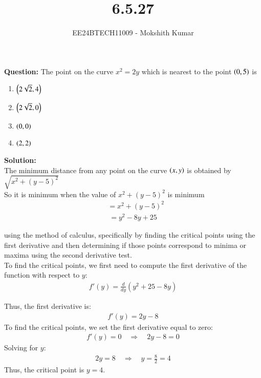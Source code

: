 \documentclass[journal]{IEEEtran}
\begin{document}

\vspace{3cm}

\title{6.5.27}
\author{EE24BTECH11009 - Mokshith Kumar}
\maketitle
\textbf{Question:}
The point on the curve $x^2=2y$ which is nearest to the point $\left(0,5\right)$ is\\
\begin{enumerate}
    \item $\left(2\sqrt{2},4\right)$
    \item $\left(2\sqrt{2},0\right)$
    \item $\left(0,0\right)$
    \item $\left(2,2\right)$
\end{enumerate}
\textbf{Solution:}\\
The minimum distance from any point on the curve $\left(x,y\right)$
is obtained by $\sqrt{x^2+(y-5)^2}$\\
So it is minimum when the value of $x^2+(y-5)^2$ is minimum\\
\begin{align}
    &= x^2+(y-5)^2 
\end{align}
\begin{align}
    = y^2-8y+25
\end{align}

using the method of calculus, specifically by finding the critical points using the first derivative and then determining if those points correspond to minima or maxima using the second derivative test.\\

To find the critical points, we first need to compute the first derivative of the function with respect to $ y $:\\
\begin{align}
  f'(y) = \frac{d}{dy}(y^2 + 25 - 8y)  
\end{align}

Thus, the first derivative is:
\begin{align}
f'(y) = 2y - 8
\end{align}
To find the critical points, we set the first derivative equal to zero:
\begin{align}
f'(y) = 0 \quad \Rightarrow \quad 2y - 8 = 0
\end{align}
Solving for \( y \):
\begin{align}
2y = 8 \quad \Rightarrow \quad y = \frac{8}{2} = 4
\end{align}
Thus, the critical point is \( y = 4 \).\\
\end{document}
